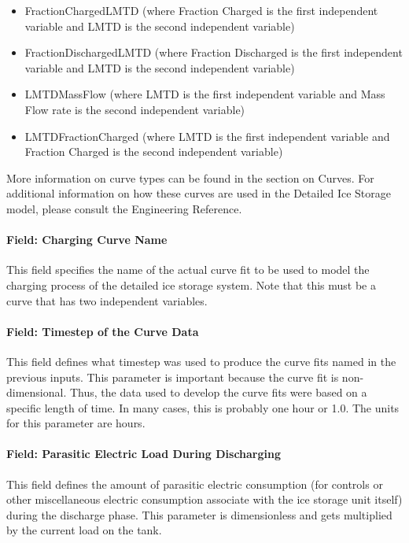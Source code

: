 \begin{itemize}
\item
FractionChargedLMTD (where Fraction Charged is the first independent variable and LMTD is the second independent variable)
\item 
FractionDischargedLMTD (where Fraction Discharged is the first independent variable and LMTD is the second independent variable)
\item
LMTDMassFlow (where LMTD is the first independent variable and Mass Flow rate is the second independent variable)
\item
LMTDFractionCharged (where LMTD is the first independent variable and Fraction Charged is the second independent variable)
\end{itemize}

More information on curve types can be found in the section on Curves.  For additional information on how these curves are used in the Detailed Ice Storage model, please consult the Engineering Reference.

\paragraph{Field: Charging Curve Name}\label{field-charging-curve-name}

This field specifies the name of the actual curve fit to be used to model the charging process of the detailed ice storage system. Note that this must be a curve that has two independent variables.

\paragraph{Field: Timestep of the Curve Data}\label{field-timestep-of-the-curve-data}

This field defines what timestep was used to produce the curve fits named in the previous inputs. This parameter is important because the curve fit is non-dimensional. Thus, the data used to develop the curve fits were based on a specific length of time. In many cases, this is probably one hour or 1.0. The units for this parameter are hours.

\paragraph{Field: Parasitic Electric Load During Discharging}\label{field-parasitic-electric-load-during-discharging}

This field defines the amount of parasitic electric consumption (for controls or other miscellaneous electric consumption associate with the ice storage unit itself) during the discharge phase. This parameter is dimensionless and gets multiplied by the current load on the tank.

